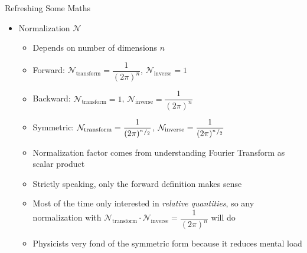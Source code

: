 \begin{frame}{Refreshing Some Maths}
%
\begin{itemize}
\item Normalization $\mathcal{N}$
	\begin{itemize}
	\setlength{\itemsep}{3pt}
	\item Depends on number of dimensions $n$
	\item Forward: $\mathcal{N}_{\text{transform}} = \dfrac{1}{(2\pi)^n}$, $\mathcal{N}_{\text{inverse}} = 1$
	\item Backward: $\mathcal{N}_{\text{transform}} = 1$, $\mathcal{N}_{\text{inverse}} = \dfrac{1}{(2\pi)^n}$
	\item Symmetric: $\mathcal{N}_{\text{transform}} = \dfrac{1}{(2\pi)^{{}^{n}/_{2}}}$, $\mathcal{N}_{\text{inverse}} = \dfrac{1}{(2\pi)^{{}^{n}/_{2}}}$
	\item Normalization factor comes from understanding Fourier Transform as scalar product
	\item Strictly speaking, only the forward definition makes sense
	\item Most of the time only interested in \emph{relative quantities}, so any normalization with 
	$\mathcal{N}_{\text{transform}} \cdot \mathcal{N}_{\text{inverse}} = \dfrac{1}{(2\pi)^n}$ will do
	\item Physicists very fond of the symmetric form because it reduces mental load
	\end{itemize}
\end{itemize}
%
\end{frame}


